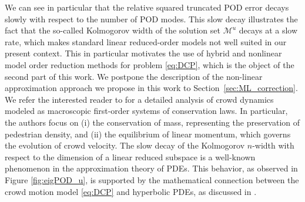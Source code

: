 We can see in particular that the relative squared truncated POD error decays slowly with respect to the number of POD modes. This slow decay illustrates the fact that the so-called Kolmogorov width of the solution set $\mathcal M^u$ decays at a slow rate, which makes standard linear reduced-order models not well suited in our present context. This in particular motivates the use of hybrid and nonlinear model order reduction methods for problem \eqref{eq:DCP}, which is the object of the second part of this work. We postpone the description of the non-linear approximation approach we propose in this work to Section~\ref{sec:ML_correction}. \\
	We refer the interested reader to \cite{bellomo2008modelling} for a detailed analysis of crowd dynamics modeled as macroscopic first-order systems of conservation laws. In particular, the authors focus on (i) the conservation of mass, representing the preservation of pedestrian density, and (ii) the equilibrium of linear momentum, which governs the evolution of crowd velocity.
	The slow decay  of the Kolmogorov $n$-width with respect to the dimension of a linear reduced subspace is a well-known phenomenon in the approximation theory of PDEs. This behavior, as observed in Figure \ref{fig:eigPOD_u}, is supported by the mathematical connection between the crowd motion model \eqref{eq:DCP} and hyperbolic PDEs, as discussed in \cite{bellomo2008modelling}.

	




